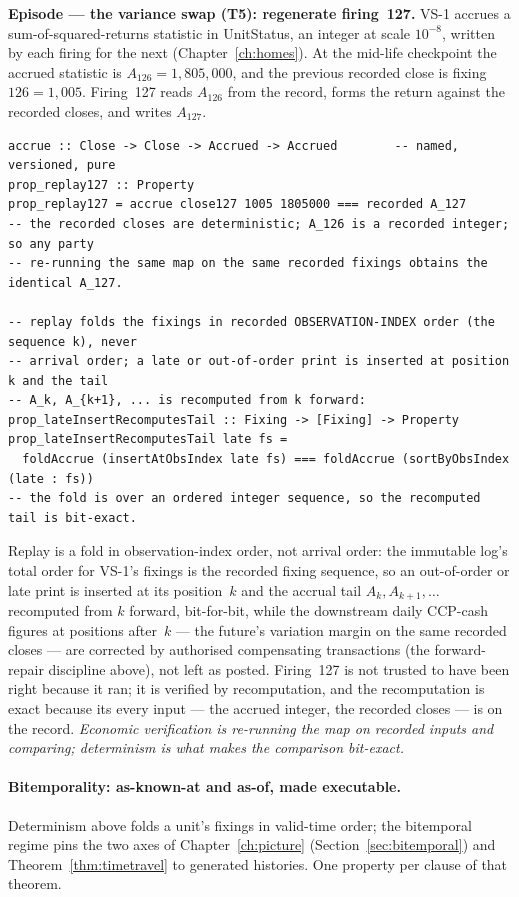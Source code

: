\medskip\noindent\textbf{Episode --- the variance swap (T5): regenerate firing~127.}
VS-1 accrues a sum-of-squared-returns statistic in UnitStatus, an integer at scale $10^{-8}$,
written by each firing for the next (Chapter~\ref{ch:homes}). At the mid-life checkpoint the
accrued statistic is $A_{126} = 1{,}805{,}000$, and the previous recorded close is fixing
$126 = 1{,}005$. Firing~127 reads $A_{126}$ from the record, forms the return against the
recorded closes, and writes $A_{127}$.

\begin{lstlisting}
accrue :: Close -> Close -> Accrued -> Accrued        -- named, versioned, pure
prop_replay127 :: Property
prop_replay127 = accrue close127 1005 1805000 === recorded A_127
-- the recorded closes are deterministic; A_126 is a recorded integer; so any party
-- re-running the same map on the same recorded fixings obtains the identical A_127.

-- replay folds the fixings in recorded OBSERVATION-INDEX order (the sequence k), never
-- arrival order; a late or out-of-order print is inserted at position k and the tail
-- A_k, A_{k+1}, ... is recomputed from k forward:
prop_lateInsertRecomputesTail :: Fixing -> [Fixing] -> Property
prop_lateInsertRecomputesTail late fs =
  foldAccrue (insertAtObsIndex late fs) === foldAccrue (sortByObsIndex (late : fs))
-- the fold is over an ordered integer sequence, so the recomputed tail is bit-exact.
\end{lstlisting}

Replay is a fold in observation-index order, not arrival order: the immutable log's total
order for VS-1's fixings is the recorded fixing sequence, so an out-of-order or late print
is inserted at its position~$k$ and the accrual tail $A_{k},A_{k+1},\dots$ recomputed from
$k$ forward, bit-for-bit, while the downstream daily CCP-cash figures at positions after~$k$
--- the future's variation margin on the same recorded closes --- are corrected by
authorised compensating transactions (the forward-repair discipline above), not left as posted. Firing~127 is not trusted to have been right
because it ran; it is verified by recomputation, and the recomputation is exact because its
every input --- the accrued integer, the recorded closes --- is on the record.
\emph{Economic verification is re-running the map on recorded inputs and comparing;
determinism is what makes the comparison bit-exact.}

\paragraph{Bitemporality: as-known-at and as-of, made executable.}
Determinism above folds a unit's fixings in valid-time order; the bitemporal regime pins the
two axes of Chapter~\ref{ch:picture} (Section~\ref{sec:bitemporal}) and
Theorem~\ref{thm:timetravel} to generated histories. One property per clause of that theorem.

